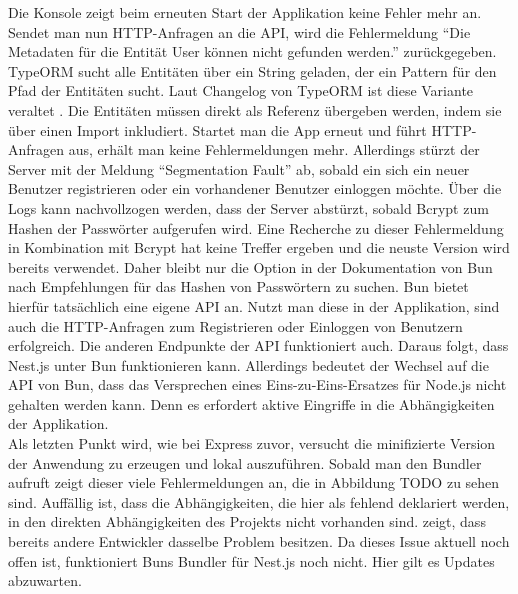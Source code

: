 
\noindent
Die Konsole zeigt beim erneuten Start der Applikation keine Fehler mehr an. Sendet man nun HTTP-Anfragen an die API, wird die Fehlermeldung ``Die Metadaten für die Entität User können nicht gefunden werden.'' zurückgegeben. TypeORM sucht alle Entitäten über ein String geladen, der ein Pattern für den Pfad der Entitäten sucht. Laut Changelog von TypeORM ist diese Variante veraltet . Die Entitäten müssen direkt als Referenz übergeben werden, indem sie über einen Import inkludiert. \newline
Startet man die App erneut und führt HTTP-Anfragen aus, erhält man keine Fehlermeldungen mehr. Allerdings stürzt der Server mit der Meldung ``Segmentation Fault'' ab, sobald ein sich ein neuer Benutzer registrieren oder ein vorhandener Benutzer einloggen möchte. Über die Logs kann nachvollzogen werden, dass der Server abstürzt, sobald Bcrypt zum Hashen der Passwörter aufgerufen wird. Eine Recherche zu dieser Fehlermeldung in Kombination mit Bcrypt hat keine Treffer ergeben und die neuste Version wird bereits verwendet. Daher bleibt nur die Option in der Dokumentation von Bun nach Empfehlungen für das Hashen von Passwörtern zu suchen. Bun bietet hierfür tatsächlich eine eigene API an. Nutzt man diese in der Applikation, sind auch die HTTP-Anfragen zum Registrieren oder Einloggen von Benutzern erfolgreich. Die anderen Endpunkte der API funktioniert auch. Daraus folgt, dass Nest.js unter Bun funktionieren kann. Allerdings bedeutet der Wechsel auf die API von Bun, dass das Versprechen eines Eins-zu-Eins-Ersatzes für Node.js nicht gehalten werden kann. Denn es erfordert aktive Eingriffe in die Abhängigkeiten der Applikation. \\

\noindent
Als letzten Punkt wird, wie bei Express zuvor, versucht die minifizierte Version der Anwendung zu erzeugen und lokal auszuführen. Sobald man den Bundler aufruft zeigt dieser viele Fehlermeldungen an, die in Abbildung TODO zu sehen sind. Auffällig ist, dass die Abhängigkeiten, die hier als fehlend deklariert werden, in den direkten Abhängigkeiten des Projekts nicht vorhanden sind.  zeigt, dass bereits andere Entwickler dasselbe Problem besitzen. Da dieses Issue aktuell noch offen ist, funktioniert Buns Bundler für Nest.js noch nicht. Hier gilt es Updates abzuwarten.

